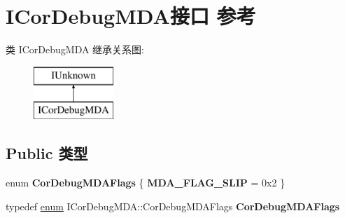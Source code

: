 \hypertarget{interface_i_cor_debug_m_d_a}{}\section{I\+Cor\+Debug\+M\+D\+A接口 参考}
\label{interface_i_cor_debug_m_d_a}
类 I\+Cor\+Debug\+M\+DA 继承关系图\+:\begin{figure}[H]
\begin{center}
\leavevmode
\includegraphics[height=2.000000cm]{interface_i_cor_debug_m_d_a}
\end{center}
\end{figure}
\subsection*{Public 类型}
\begin{DoxyCompactItemize}
\item 
\mbox{\label{interface_i_cor_debug_m_d_a_ac5a385e90a61163d8e0d8b2b8883fa6b}} 
enum {\bfseries Cor\+Debug\+M\+D\+A\+Flags} \{ {\bfseries M\+D\+A\+\_\+\+F\+L\+A\+G\+\_\+\+S\+L\+IP} = 0x2
 \}
\item 
\mbox{\label{interface_i_cor_debug_m_d_a_a9d30f4626d66a30461b364d0c72c1a49}} 
typedef \hyperlink{interfaceenum}{enum} I\+Cor\+Debug\+M\+D\+A\+::\+Cor\+Debug\+M\+D\+A\+Flags {\bfseries Cor\+Debug\+M\+D\+A\+Flags}
\end{DoxyCompactItemize}
